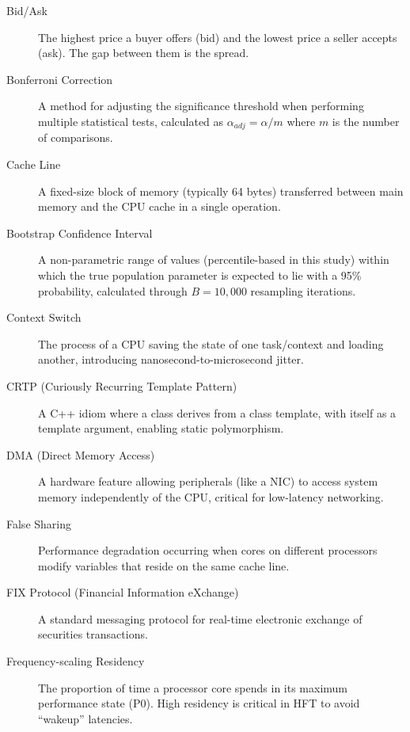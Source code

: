 \documentclass[12pt,a4paper]{report}
\begin{document}
\begin{description}

\item[Bid/Ask] The highest price a buyer offers (bid) and the lowest price a seller accepts (ask). The gap between them is the spread.

\item[Bonferroni Correction] A method for adjusting the significance threshold when performing multiple statistical tests, calculated as $\alpha_{adj} = \alpha/m$ where $m$ is the number of comparisons.

\item[Cache Line] A fixed-size block of memory (typically 64 bytes) transferred between main memory and the CPU cache in a single operation.

\item[Bootstrap Confidence Interval] A non-parametric range of values (percentile-based in this study) within which the true population parameter is expected to lie with a 95\% probability, calculated through $B=10{,}000$ resampling iterations.

\item[Context Switch] The process of a CPU saving the state of one task/context and loading another, introducing nanosecond-to-microsecond jitter.

\item[CRTP (Curiously Recurring Template Pattern)] A C++ idiom where a class derives from a class template, with itself as a template argument, enabling static polymorphism.

\item[DMA (Direct Memory Access)] A hardware feature allowing peripherals (like a NIC) to access system memory independently of the CPU, critical for low-latency networking.

\item[False Sharing] Performance degradation occurring when cores on different processors modify variables that reside on the same cache line.

\item[FIX Protocol (Financial Information eXchange)] A standard messaging protocol for real-time electronic exchange of securities transactions.

\item[Frequency-scaling Residency] The proportion of time a processor core spends in its maximum performance state (P0). High residency is critical in HFT to avoid ``wakeup'' latencies.


\end{description}
\end{document}
